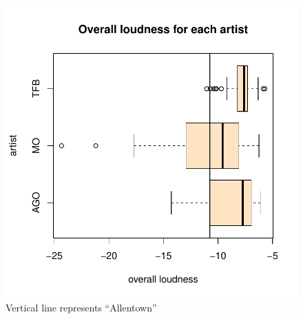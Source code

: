 \documentclass{article}\usepackage[]{graphicx}\usepackage[]{xcolor}
\makeatletter
\def\maxwidth{ %
  \ifdim\Gin@nat@width>\linewidth
    \linewidth
  \else
    \Gin@nat@width
  \fi
}
\newenvironment{knitrout}{}{} %
\makeatother
\begin{document}
\begin{multicols}{2}
\begin{figure}[H]
\begin{knitrout}\scriptsize
{}\color{fgcolor}
\includegraphics[width=\maxwidth]{figure/unnamed-chunk-3-1} 
\end{knitrout}
\caption{Vertical line represents ``Allentown''} \label{plot1}
\end{figure}


\end{multicols}
\end{document}
